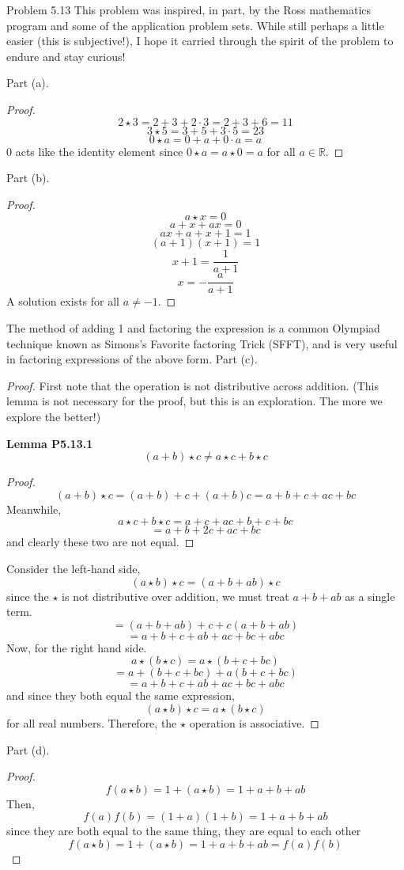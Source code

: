 \begin{sol}{Problem 5.13}
This problem was inspired, in part, by the Ross mathematics program and some of the application problem sets. While still perhaps a little easier (this is subjective!), I hope it carried through the spirit of the problem to endure and stay curious!

Part (a).
\begin{proof}
\[
2 \star 3 = 2 + 3 + 2 \cdot 3 = 2 + 3 + 6 = 11
\]
\[
3 \star 5 = 3 + 5 + 3 \cdot 5 = 23
\]
\[
0 \star a = 0 + a + 0 \cdot a = a
\]
$0$ acts like the identity element since $0 \star a = a \star 0 = a$ for all $a \in \mathbb{R}$. 
\end{proof}
Part (b).
\begin{proof}
\[
a \star x = 0
\]
\[
a + x + ax = 0
\]
\[
ax + a + x + 1 = 1
\]
\[
(a+1)(x+1) = 1
\]
\[
x+1 =\frac{1}{a+1}
\]
\[
\boxed{x = -\frac{a}{a+1}}
\]
A solution exists for all $a \neq -1$.
\end{proof}
The method of adding 1 and factoring the expression is a common Olympiad technique known as Simons's Favorite factoring Trick (SFFT), and is very useful in factoring expressions of the above form. 
Part (c).
\begin{proof}
First note that the operation is not distributive across addition. (This lemma is not necessary for the proof, but this is an exploration. The more we explore the better!)

\textbf{Lemma P5.13.1}
\[
(a+b) \star c \neq a \star c + b \star c
\]
\begin{proof}
\[
(a+b) \star c = (a+b) + c + (a+b)c = a + b + c + ac + bc
\]
Meanwhile,
\[
a \star c + b \star c = a + c + ac + b + c + bc
\]
\[
= a + b + 2c + ac + bc
\]
and clearly these two are not equal.
\end{proof}

Consider the left-hand side,
\[
(a \star b) \star c = (a + b + ab) \star c
\]
since the $\star$ is not distributive over addition, we must treat $a + b + ab$ as a single term.
\[
= (a + b + ab) + c + c(a + b + ab)
\]
\[
 = a + b + c + ab + ac + bc + abc
\]
Now, for the right hand side.
\[
a \star (b \star c) = a \star (b + c + bc)
\]
\[
= a + (b + c + bc) + a(b + c + bc)
\]
\[
= a + b + c + ab + ac + bc + abc
\]
and since they both equal the same expression, 
\[
(a \star b) \star c = a \star (b \star c)
\]
for all real numbers. Therefore, the $\star$ operation is associative.
\end{proof}

Part (d).
\begin{proof}
\[
f(a \star b) = 1 + (a \star b) = 1  + a + b + ab
\]
Then,
\[
f(a)f(b) = (1+a)(1+b) = 1 +a + b + ab
\]
since they are both equal to the same thing, they are equal to each other
\[
f(a \star b) = 1 + (a \star b) = 1  + a + b + ab = f(a)f(b)
\]
\end{proof}


\end{sol}
